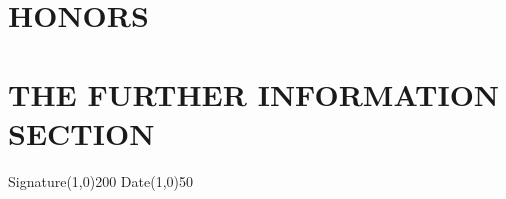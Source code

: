 \documentclass{article}
\begin{document}
\section{HONORS}


\section{THE FURTHER INFORMATION SECTION}

\vspace{2in}


\begin{center}
Signature\line(1,0){200}\hspace{5em} Date\line(1,0){50}
\end{center}
\end{document}
